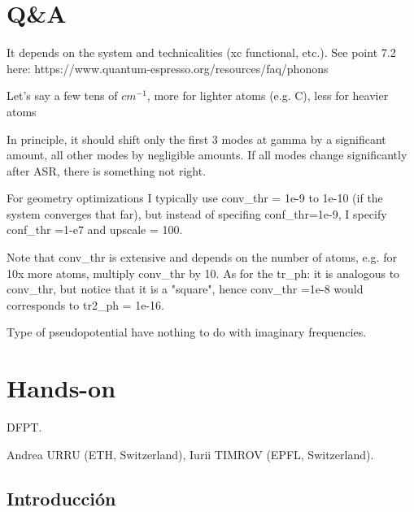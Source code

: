 \section{Q\&A}


  It depends on the system and technicalities (xc functional, etc.). See point 7.2 here: https://www.quantum-espresso.org/resources/faq/phonons

  Let's say a few tens of $cm^{-1}$, more for lighter atoms (e.g. C), less for heavier atoms


  In principle, it should shift only the first 3 modes at gamma by a significant amount, all other modes by negligible amounts. If all modes change significantly after ASR, there is something not right.


  For geometry optimizations I typically use conv\_thr = 1e-9 to 1e-10 (if the system converges that far), but instead of specifing conf\_thr=1e-9, I specify conf\_thr =1-e7 and upscale = 100.

  Note that conv\_thr is extensive and depends on the number of atoms, e.g. for 10x more atoms, multiply conv\_thr by 10.
  As for the tr\_ph: it is analogous to conv\_thr, but notice that it is a "square", hence conv\_thr =1e-8 would corresponds to tr2\_ph = 1e-16.

  Type of  pseudopotential have nothing to do with imaginary frequencies.

\section{Hands-on}

   DFPT.

   Andrea URRU (ETH, Switzerland), Iurii TIMROV (EPFL, Switzerland).

\subsection{Introducción}

